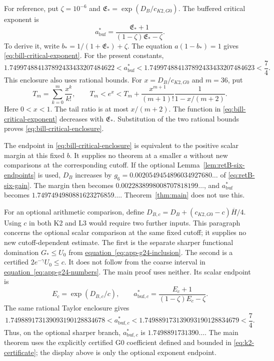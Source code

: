 For reference, put $\zeta=10^{-6}$ and $\mathfrak E_*=\exp(D_B/c_{K2,G0})$.
The buffered critical exponent is
\begin{equation}\label{eq:bill-critical-exponent}
 a_{\mathrm{buf}}^*
 =\frac{\mathfrak E_*+1}{(1-\zeta)\mathfrak E_*-\zeta}.
\end{equation}
To derive it, write $b_*=1/(1+\mathfrak E_*)+\zeta$.
The equation $a(1-b_*)=1$ gives
\eqref{eq:bill-critical-exponent}.
For the present constants,
\begin{equation}\label{eq:bill-critical-enclosure}
 1.749974884137892433433207484622
 <a_{\mathrm{buf}}^*
 <1.749974884137892433433207484623<\frac74.
\end{equation}
This enclosure also uses rational bounds.
For $x=D_B/c_{K2,G0}$ and $m=36$, put
\begin{equation}\label{eq:bill-exp-enclosure}
 T_m=\sum_{k=0}^{m}\frac{x^k}{k!},\qquad
 T_m<e^x<T_m+
 \frac{x^{m+1}}{(m+1)!}\frac{1}{1-x/(m+2)}.
\end{equation}
Here $0<x<1$.
The tail ratio is at most $x/(m+2)$.
The function in \eqref{eq:bill-critical-exponent} decreases with $\mathfrak E_*$.
Substitution of the two rational bounds proves
\eqref{eq:bill-critical-enclosure}.

The endpoint in \eqref{eq:bill-critical-enclosure} is equivalent to the
positive scalar margin at this fixed $b$. It supplies no theorem at a
smaller $a$ without new comparisons at the corresponding cutoff.
If the optional Lemma~\ref{lem:retB-six-endpoints} is used, $D_B$ increases by
$g_6=0.0020549454896034927680\ldots$ of \eqref{eq:retB-six-gain}. The margin
then becomes $0.0022838998008707818199\ldots$, and $a_{\mathrm{buf}}^*$ becomes
$1.7497494980881623276859\ldots$. Theorem~\ref{thm:main} does not use this.

For an optional arithmetic comparison, define
$D_{B,c}=D_B+(c_{K2,G0}-c)\overline H/4$.
Using $c$ in both K2 and L3 would require two further inputs.
This paragraph concerns the optional scalar comparison at the same fixed cutoff;
it supplies no new cutoff-dependent estimate. The first is
the separate sharper functional domination $G_*\le U_0$ from
\hyperref[eq:app-g24-inclusion]{equation~\ref*{eq:app-g24-inclusion}}. The second is a certified
$2e^{-\gamma}U_0\le c$. It does not follow from the coarse
interval in \hyperref[eq:app-g24-numbers]{equation~\ref*{eq:app-g24-numbers}}. The main proof uses
neither.
Its scalar endpoint is
\begin{equation}\label{eq:bill-active-critical-exponent}
 E_c=\exp(D_{B,c}/c),\qquad
 a^*_{\mathrm{buf},c}
 =\frac{E_c+1}{(1-\zeta)E_c-\zeta}.
\end{equation}
The same rational Taylor enclosure gives
\begin{equation}\label{eq:bill-active-critical-enclosure}
 1.749889173139093190128834678
 <a^*_{\mathrm{buf},c}
 <1.749889173139093190128834679<\frac74.
\end{equation}
Thus, on the optional sharper branch, $a^*_{\mathrm{buf},c}$ is
$1.7498891731390\ldots$. The main theorem uses the explicitly certified
G0 coefficient defined and bounded in \eqref{eq:k2-certificate}; the
display above is only the optional exponent endpoint.

